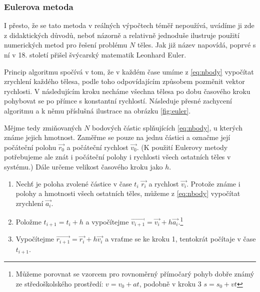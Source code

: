 \documentclass[A4paper, 12pt, oneside]{book}
\begin{document}
\subsubsection{Eulerova metoda}
I přesto, že se tato metoda v reálných výpočtech téměř nepoužívá, uvádíme ji zde z didaktických důvodů, neboť názorně a relativně jednoduše ilustruje použití numerických metod pro řešení problému $N$ těles. Jak již název napovídá, poprvé s ní v 18. století přišel švýcarský matematik Leonhard Euler.

Princip algoritmu spočívá v tom, že v každém čase umíme z \eqref{eq:nbody} vypočítat zrychlení každého tělesa, podle toho odpovídajícím způsobem pozměnit vektor rychlosti. V následujícím kroku necháme všechna tělesa po dobu časového kroku pohybovat se po přímce s konstantní rychlostí. Následuje přesné zachycení algoritmu a k němu příslušná ilustrace na obrázku \ref{fig:euler}.

Mějme tedy zmiňovaných $N$ bodových částic splňujících \eqref{eq:nbody}, u kterých známe jejich hmotnost. Zaměřme se pouze na jednu částici a označme její počáteční polohu $\vec{r_0}$ a počáteční rychlost $\vec{v_0}$. (K použití Eulerovy metody potřebujeme ale znát i počáteční polohy i rychlosti všech ostatních těles v systému.) Dále určeme velikost časového kroku jako $h$.
\begin{enumerate}
	\item Nechť je poloha zvolené částice v čase $t_i$ $\vec{r_i}$ a rychlost $\vec{v_i}$. Protože známe i polohy a hmotnosti všech ostatních těles, můžeme z \eqref{eq:nbody} vypočítat zrychlení $\vec{a_i}$. 
	\item Položme $t_{i+1} = t_i+h$ a vypočítejme $\vec{v_{i+1}} = \vec{v_i} + h\vec{a_i}$.\footnote{Můžeme porovnat se vzorcem pro rovnoměrný přímočarý pohyb dobře známý ze středoškolského prostředí: $v = v_0 + at$, podobně v kroku 3 $s = s_0 + vt$}
	\item Vypočítejme $\vec{r_{i+1}} = \vec{r_i} + h\vec{v_i}$ a vraťme se ke kroku 1, tentokrát počítaje v čase $t_{i+1}$. 
\end{enumerate}
\end{document}
